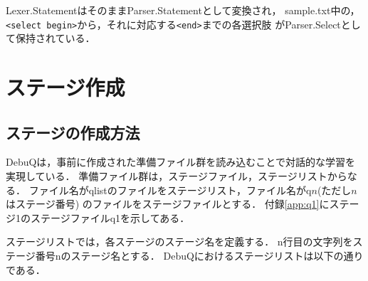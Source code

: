 \documentclass{jreport}
\begin{document}
Lexer.StatementはそのままParser.Statementとして変換され，
sample.txt中の，\verb|<select begin>|から，それに対応する\verb|<end>|までの各選択肢
がParser.Selectとして保持されている．

\section{ステージ作成}
\subsection{ステージの作成方法}
DebuQは，事前に作成された準備ファイル群を読み込むことで対話的な学習を実現している．
準備ファイル群は，ステージファイル，ステージリストからなる．
ファイル名がqlistのファイルをステージリスト，ファイル名がq$n$(ただし$n$はステージ番号)
のファイルをステージファイルとする．
付録\ref{app:q1}にステージ1のステージファイルq1を示してある．

ステージリストでは，各ステージのステージ名を定義する．
n行目の文字列をステージ番号nのステージ名とする．
DebuQにおけるステージリストは以下の通りである．

\end{document}
